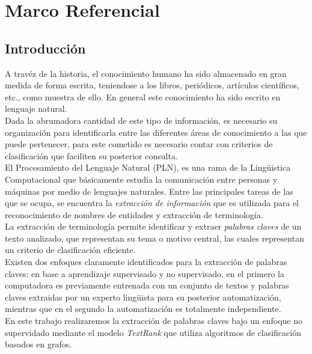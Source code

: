 \chapter{Marco Referencial}
\section{Introducci\'on}
A trav\'ez de la historia, el conocimiento humano ha sido almacenado en gran medida
de forma escrita, teniendose a los libros, peri\'odicos, art\'iculos cient\'ificos,
etc., como muestra de ello. En general este conocimiento ha sido escrito en lenguaje
natural. \\

Dada la abrumadora cantidad de este tipo de informaci\'on, es necesario su organizaci\'on
para identificarla entre las diferentes \'areas de conocimiento a las que puede 
pertenecer, para este cometido es necesario contar con criterios de clasificaci\'on 
que faciliten su posterior consulta. \\

El Procesamiento del Lenguaje Natural (PLN), es una rama de la Ling\"uistica 
Computacional que b\'asicamente estudia la comunicaci\'on entre personas y 
m\'aquinas por medio de lenguajes naturales. Entre las principales tareas de las que 
se ocupa, se encuentra la \emph{extracci\'on de informaci\'on} que es utilizada 
para el reconocimiento de nombres de entidades y extracci\'on de terminolog\'ia. \\

La extracci\'on de terminolog\'ia permite identificar y extraer \emph{palabras claves} 
de un texto analizado, que representan su tema o motivo central, las cuales representan
un criterio de clasificaci\'on eficiente.\\

Existen dos enfoques claramente identificados para la extracci\'on de palabras claves:
en base a aprendizaje supervisado y no supervisado, en el primero la computadora es
previamente entrenada con un conjunto de textos y palabras claves extraidas por
un experto ling\"uista para su posterior automatizaci\'on, mientras que en el segundo
la automatizaci\'on es totalmente independiente.\\

En este trabajo realizaremos la extracci\'on de palabras claves bajo un enfoque no
supervidado mediante el modelo \emph{TextRank} que utiliza algoritmos de clasificaci\'on
basados en grafos.\\

